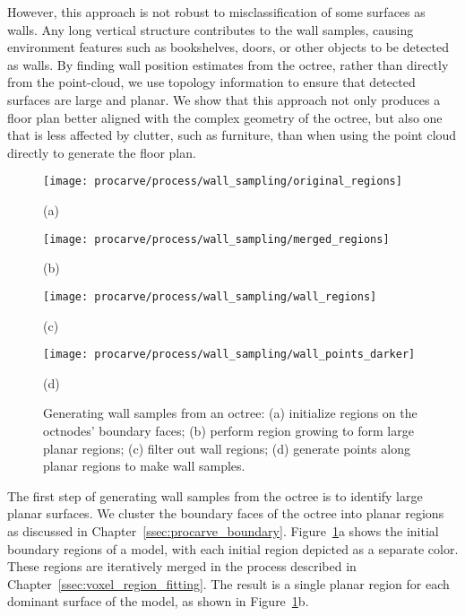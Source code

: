 \documentclass[12pt,onecolumn,oneside]{book}
\begin{document}
However, this approach is not robust to misclassification of some surfaces as walls.  Any long vertical structure contributes to the wall samples, causing environment features such as bookshelves, doors, or other objects to be detected as walls.  By finding wall position estimates from the octree, rather than directly from the point-cloud, we use topology information to ensure that detected surfaces are large and planar.  We show that this approach not only produces a floor plan better aligned with the complex geometry of the octree, but also one that is less affected by clutter, such as furniture, than when using the point cloud directly to generate the floor plan.

\begin{figure}
	\begin{minipage}[t]{0.45\linewidth}
		\centerline{\texttt{[image: procarve/process/wall\_sampling/original\_regions]}}
		\centerline{(a)}
	\end{minipage}
	\hfill
	\begin{minipage}[t]{0.45\linewidth}
		\centerline{\texttt{[image: procarve/process/wall\_sampling/merged\_regions]}}
		\centerline{(b)}
	\end{minipage}
	

	\begin{minipage}[t]{0.45\linewidth}
		\centerline{\texttt{[image: procarve/process/wall\_sampling/wall\_regions]}}
		\centerline{(c)}
	\end{minipage}
	\hfill
	\begin{minipage}[t]{0.45\linewidth}
		\centerline{\texttt{[image: procarve/process/wall\_sampling/wall\_points\_darker]}}
		\centerline{(d)}
	\end{minipage}

	\caption[Generating wall samples from an octree.]{Generating wall samples from an octree: (a) initialize regions on the octnodes' boundary faces; (b) perform region growing to form large planar regions; (c) filter out wall regions; (d) generate points along planar regions to make wall samples.}
	\label{fig:oct2dq}
\end{figure}

The first step of generating wall samples from the octree is to identify large planar surfaces.  We cluster the boundary faces of the octree into planar regions as discussed in Chapter~\ref{ssec:procarve_boundary}.  Figure~\ref{fig:oct2dq}a shows the initial boundary regions of a model, with each initial region depicted as a separate color.  These regions are iteratively merged in the process described in Chapter~\ref{ssec:voxel_region_fitting}.  The result is a single planar region for each dominant surface of the model, as shown in Figure~\ref{fig:oct2dq}b.  
\end{document}

